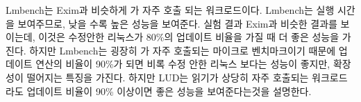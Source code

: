 Lmbench는 Exim과 비슷하게 가 자주 호출 되는 워크로드이다.
Lmbench는 실행 시간을 보여주므로, 낮을 수록 높은 성능을 보여준다. 
실험 결과 Exim과 비슷한 결과를 보이는데, 이것은 수정안한 리눅스가 80\%의 업데이트 
비율을 가질 때 더 좋은 성능을 가진다.
하지만 Lmbench는 굉장히 가 자주 호출되는 마이크로 벤치마크이기 때문에 업데이트 연산의 비율이 
90\%가 되면 비록 수정 안한 리눅스 보다는 성능이 좋지만, 확장성이 떨어지는 특징을 가진다.
하지만 LUD는 읽기가 상당히 자주 호출되는 워크로드라도 업데이트 비율이 90\% 이상이면 
좋은 성능을 보여준다는것을 설명한다. 
 
